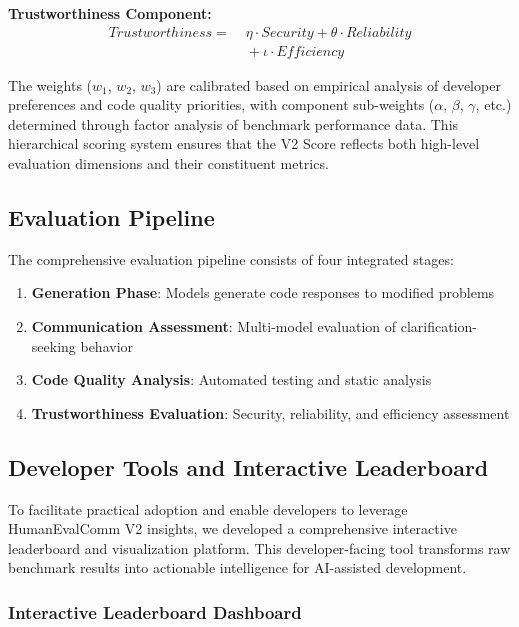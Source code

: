 \documentclass[conference]{IEEEtran}
\begin{document}
\textbf{Trustworthiness Component:}
\begin{align}
    \mathit{Trustworthiness} =
    &\; \eta \cdot \mathit{Security}
    + \theta \cdot \mathit{Reliability} \\
    &\; + \iota \cdot \mathit{Efficiency}
\end{align}

The weights ($w_1$, $w_2$, $w_3$) are calibrated based on empirical analysis of developer preferences and code quality priorities, with component sub-weights ($\alpha$, $\beta$, $\gamma$, etc.) determined through factor analysis of benchmark performance data. This hierarchical scoring system ensures that the V2 Score reflects both high-level evaluation dimensions and their constituent metrics.

\subsection{Evaluation Pipeline}

The comprehensive evaluation pipeline consists of four integrated stages:

\begin{enumerate}
    \item \textbf{Generation Phase}: Models generate code responses to modified problems
    \item \textbf{Communication Assessment}: Multi-model evaluation of clarification-seeking behavior
    \item \textbf{Code Quality Analysis}: Automated testing and static analysis
    \item \textbf{Trustworthiness Evaluation}: Security, reliability, and efficiency assessment
\end{enumerate}

\subsection{Developer Tools and Interactive Leaderboard}

To facilitate practical adoption and enable developers to leverage HumanEvalComm V2 insights, we developed a comprehensive interactive leaderboard and visualization platform. This developer-facing tool transforms raw benchmark results into actionable intelligence for AI-assisted development.

\subsubsection{Interactive Leaderboard Dashboard}
\end{document}
